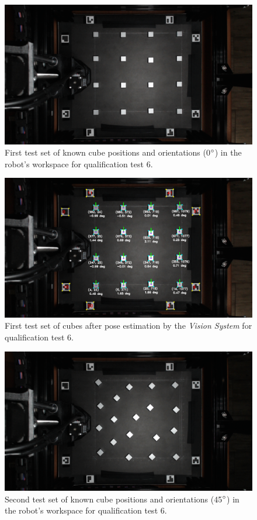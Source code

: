 \begin{figure}[!ht]
	\centering
	\includegraphics[width=1\linewidth]{figures/qtp6-set1.png}
	\caption{First test set of known cube positions and orientations (0$^{\circ}$) in the robot's workspace for qualification test 6.}
	\label{fig:qtp6-set1}
\end{figure}

\begin{figure}[!ht]
	\centering
	\includegraphics[width=1\linewidth]{figures/qtp6-set1-annotated.png}
	\caption{First test set of cubes after pose estimation by the \textit{Vision System} for qualification test 6.}
	\label{fig:qtp6-set1-annotated}
\end{figure}

\begin{figure}[!ht]
	\centering
	\includegraphics[width=1\linewidth]{figures/qtp6-set2.png}
	\caption{Second test set of known cube positions and orientations (45$^{\circ}$) in the robot's workspace for qualification test 6.}
	\label{fig:qtp6-set2}
\end{figure}

